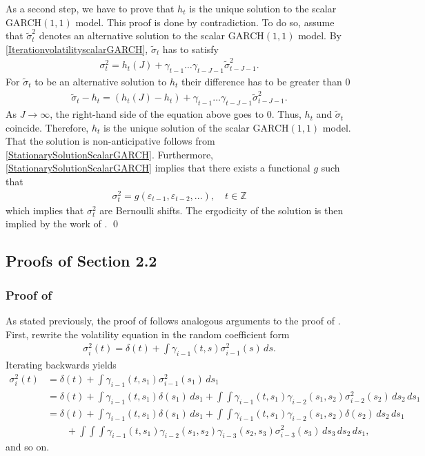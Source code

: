 \documentclass[12pt,a4paper]{article}
\theoremstyle{definition}
\begin{document}
As a second step, we have to prove that $h_t$ is the unique solution to the scalar GARCH$(1,1)$ model. This proof is done by contradiction. To do so, assume that $\tilde{\sigma}_t^2$ denotes an alternative solution to the scalar GARCH$(1,1)$ model. By \cref{IterationvolatilityscalarGARCH}, $\tilde{\sigma}_t$ has to satisfy
\begin{gather}
    \sigma_t^2 = h_t(J) + \gamma_{t-1}\dots\gamma_{t-J-1}\tilde{\sigma}_{t-J-1}^2.
\end{gather}
For $\tilde{\sigma}_t$ to be an alternative solution to $h_t$ their difference has to be greater than $0$
\begin{gather}
    \tilde{\sigma}_t-h_t = (h_t(J)-h_t) + \gamma_{t-1}\dots\gamma_{t-J-1}\tilde{\sigma}_{t-J-1}^2.
\end{gather}
As $J\rightarrow\infty$, the right-hand side of the equation above goes to $0$. Thus, $h_t$ and $\tilde{\sigma}_t$ coincide. Therefore, $h_t$ is the unique solution of the scalar GARCH$(1,1)$ model.
That the solution is non-anticipative follows from \cref{StationarySolutionScalarGARCH}. Furthermore, \cref{StationarySolutionScalarGARCH} implies that there exists a functional $g$ such that
\begin{gather}
    \sigma_t^2=g(\varepsilon_{t-1},\varepsilon_{t-2},...), \quad t \in\mathbb{Z}
\end{gather}
which implies that $\sigma_t^2$ are Bernoulli shifts. The ergodicity of the solution is then implied by the work of \citet{stout1974almost}. \qed
\subsection{Proofs of Section 2.2}
\subsubsection[Proof of Theorem 2.2]{Proof of }
\label{subsec:ProofStationarityFGARCH}
As stated previously, the proof of  follows analogous arguments to the proof of . First, rewrite the volatility equation in the random coefficient form
\begin{gather}
    \sigma_i^2(t)=\delta(t)+\int \gamma_{i-1}(t,s)\sigma_{i-1}^2(s)\,ds .
\end{gather}
Iterating backwards yields
\begin{align*}
    \sigma_i^2(t)
    &= \delta(t)+\int \gamma_{i-1}(t,s_1)\sigma_{i-1}^2(s_1)\,ds_1 \\
    &= \delta(t)+\int \gamma_{i-1}(t,s_1)\delta(s_1)\,ds_1
      +\int\!\!\int \gamma_{i-1}(t,s_1)\gamma_{i-2}(s_1,s_2)\sigma_{i-2}^2(s_2)\,ds_2\,ds_1 \\
    &= \delta(t)+\int \gamma_{i-1}(t,s_1)\delta(s_1)\,ds_1
      +\int\!\!\int \gamma_{i-1}(t,s_1)\gamma_{i-2}(s_1,s_2)\delta(s_2)\,ds_2\,ds_1 \\
    &\qquad
      +\int\!\!\int\!\!\int \gamma_{i-1}(t,s_1)\gamma_{i-2}(s_1,s_2)\gamma_{i-3}(s_2,s_3)\sigma_{i-3}^2(s_3)\,ds_3\,ds_2\,ds_1 ,
\end{align*}
and so on.
\end{document}
